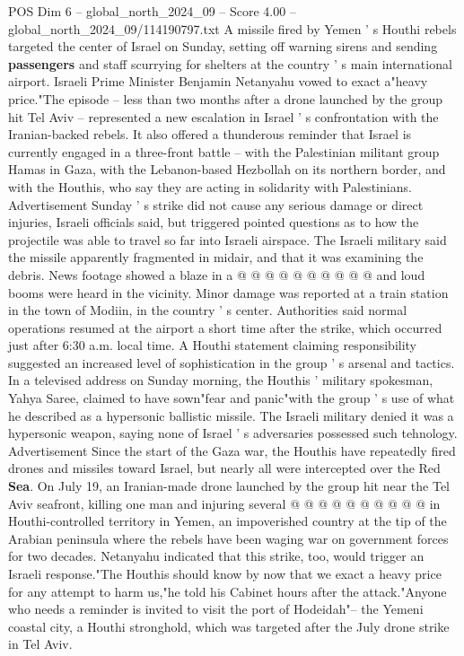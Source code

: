 \begin{textsample}{POS Dim 6 – global\_north\_2024\_09 – Score 4.00 – global\_north\_2024\_09/114190797.txt}  \label{ex:f6_pos_428}
A missile fired by Yemen ' s Houthi rebels targeted the center of Israel on Sunday, setting off warning sirens and sending \textbf{passengers} and staff scurrying for shelters at the country ' s main international airport.
Israeli Prime Minister Benjamin Netanyahu vowed to exact a"heavy price."The episode -- less than two months after a drone launched by the group hit Tel Aviv -- represented a new escalation in Israel ' s confrontation with the Iranian-backed rebels.
It also offered a thunderous reminder that Israel is currently engaged in a three-front battle -- with the Palestinian militant group Hamas in Gaza, with the Lebanon-based Hezbollah on its northern border, and with the Houthis, who say they are acting in solidarity with Palestinians.
Advertisement Sunday ' s strike did not cause any serious damage or direct injuries, Israeli officials said, but triggered pointed questions as to how the projectile was able to travel so far into Israeli airspace.
The Israeli military said the missile apparently fragmented in midair, and that it was examining the debris.
News footage showed a blaze in a @ @ @ @ @ @ @ @ @ @ and loud booms were heard in the vicinity.
Minor damage was reported at a train station in the town of Modiin, in the country ' s center.
Authorities said normal operations resumed at the airport a short time after the strike, which occurred just after 6:30 a.m. local time.
A Houthi statement claiming responsibility suggested an increased level of sophistication in the group ' s arsenal and tactics.
In a televised address on Sunday morning, the Houthis ' military spokesman, Yahya Saree, claimed to have sown"fear and panic"with the group ' s use of what he described as a hypersonic ballistic missile.
The Israeli military denied it was a hypersonic weapon, saying none of Israel ' s adversaries possessed such tehnology.
Advertisement Since the start of the Gaza war, the Houthis have repeatedly fired drones and missiles toward Israel, but nearly all were intercepted over the Red \textbf{Sea}.
On July 19, an Iranian-made drone launched by the group hit near the Tel Aviv seafront, killing one man and injuring several @ @ @ @ @ @ @ @ @ @ in Houthi-controlled territory in Yemen, an impoverished country at the tip of the Arabian peninsula where the rebels have been waging war on government forces for two decades.
Netanyahu indicated that this strike, too, would trigger an Israeli response."The Houthis should know by now that we exact a heavy price for any attempt to harm us,"he told his Cabinet hours after the attack."Anyone who needs a reminder is invited to visit the port of Hodeidah"-- the Yemeni coastal city, a Houthi stronghold, which was targeted after the July drone strike in Tel Aviv.

\end{textsample}
